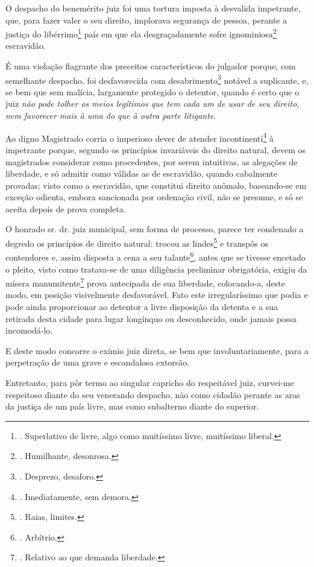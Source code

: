 O despacho do benemérito juiz foi uma tortura imposta à desvalida
impetrante, que, para fazer valer o seu direito, implorava segurança de
pessoa, perante a justiça do libérrimo\footnote{. Superlativo de livre,
  algo como muitíssimo livre, muitíssimo liberal.} país em que ela
desgraçadamente sofre ignominiosa\footnote{. Humilhante, desonrosa.}
escravidão.

É uma violação flagrante dos preceitos característicos do julgador
porque, com semelhante despacho, foi desfavorecida com
desabrimento\footnote{. Desprezo, desaforo.} notável a suplicante, e, se
bem que sem malícia, largamente protegido o detentor, quando é certo que
o juiz \emph{não pode tolher os meios legítimos que tem cada um de usar
de seu direito, nem favorecer mais à uma do que à outra parte
litigante}.

Ao digno Magistrado corria o imperioso dever de atender
incontinenti\footnote{. Imediatamente, sem demora.} à impetrante porque,
segundo os princípios invariáveis do direito natural, devem os
magistrados considerar como procedentes, por serem intuitivas, as
alegações de liberdade, e só admitir como válidas as de escravidão,
quando cabalmente provadas; visto como a escravidão, que constitui
direito anômalo, baseando-se em exceção odienta, embora sancionada por
ordenação civil, não se presume, e só se aceita depois de prova
completa.

O honrado sr. dr. juiz municipal, sem forma de processo, parece ter
condenado a degredo os princípios de direito natural: trocou as
lindes\footnote{. Raias, limites.} e transpôs os contendores e, assim
disposta a cena a seu talante\footnote{. Arbítrio.}, antes que se
tivesse encetado o pleito, visto como tratava-se de uma diligência
preliminar obrigatória, exigiu da mísera manumitente\footnote{. Relativo
  ao que demanda liberdade.} prova antecipada de sua liberdade,
colocando-a, deste modo, em posição visivelmente desfavorável. Fato este
irregularíssimo que podia e pode ainda proporcionar ao detentor a livre
disposição da detenta e a sua retirada desta cidade para lugar longínquo
ou desconhecido, onde jamais possa incomodá-lo.

E deste modo concorre o exímio juiz direta, se bem que
involuntariamente, para a perpetração de uma grave e escandalosa
extorsão.

Entretanto, para pôr termo ao singular capricho do respeitável juiz,
curvei-me respeitoso diante do seu venerando despacho, não como cidadão
perante as aras da justiça de um país livre, mas como subalterno diante
do superior.


